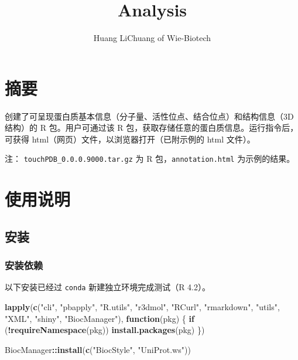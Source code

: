 \documentclass[
]{article}
\title{Analysis}
\author{Huang LiChuang of Wie-Biotech}
\date{}
\newenvironment{Shaded}{\begin{snugshade}}{\end{snugshade}}
\newcommand{\ControlFlowTok}[1]{\textcolor[rgb]{0.13,0.29,0.53}{\textbf{#1}}}
\newcommand{\KeywordTok}[1]{\textcolor[rgb]{0.13,0.29,0.53}{\textbf{#1}}}
\newcommand{\NormalTok}[1]{#1}
\newcommand{\OperatorTok}[1]{\textcolor[rgb]{0.81,0.36,0.00}{\textbf{#1}}}
\newcommand{\StringTok}[1]{\textcolor[rgb]{0.31,0.60,0.02}{#1}}
\begin{document}
\maketitle

{
\setcounter{tocdepth}{3}
\tableofcontents
}
\listoffigures

\listoftables

\hypertarget{abstract}{%
\section{摘要}\label{abstract}}

创建了可呈现蛋白质基本信息（分子量、活性位点、结合位点）和结构信息（3D 结构）的 R 包。用户可通过该 R 包，获取存储任意的蛋白质信息。运行指令后，可获得 html（网页）文件，以浏览器打开（已附示例的 html 文件）。

注： \texttt{touchPDB\_0.0.0.9000.tar.gz} 为 R 包，\texttt{annotation.html} 为示例的结果。

\hypertarget{results}{%
\section{使用说明}\label{results}}

\hypertarget{ux5b89ux88c5}{%
\subsection{安装}\label{ux5b89ux88c5}}

\hypertarget{ux5b89ux88c5ux4f9dux8d56}{%
\subsubsection{安装依赖}\label{ux5b89ux88c5ux4f9dux8d56}}

以下安装已经过 \texttt{conda} 新建独立环境完成测试（R 4.2）。

\begin{Shaded}
\begin{Highlighting}[]
\KeywordTok{lapply}\NormalTok{(}\KeywordTok{c}\NormalTok{(}\StringTok{"cli"}\NormalTok{, }\StringTok{"pbapply"}\NormalTok{, }\StringTok{"R.utils"}\NormalTok{, }\StringTok{"r3dmol"}\NormalTok{, }\StringTok{"RCurl"}\NormalTok{,}
    \StringTok{"rmarkdown"}\NormalTok{, }\StringTok{"utils"}\NormalTok{, }\StringTok{"XML"}\NormalTok{, }\StringTok{"shiny"}\NormalTok{, }\StringTok{"BiocManager"}\NormalTok{),}
  \ControlFlowTok{function}\NormalTok{(pkg) \{}
    \ControlFlowTok{if}\NormalTok{ (}\OperatorTok{!}\KeywordTok{requireNamespace}\NormalTok{(pkg))}
      \KeywordTok{install.packages}\NormalTok{(pkg)}
\NormalTok{  \})}

\NormalTok{BiocManager}\OperatorTok{::}\KeywordTok{install}\NormalTok{(}\KeywordTok{c}\NormalTok{(}\StringTok{"BiocStyle"}\NormalTok{, }\StringTok{"UniProt.ws"}\NormalTok{))}
\end{Highlighting}
\end{Shaded}
\end{document}
